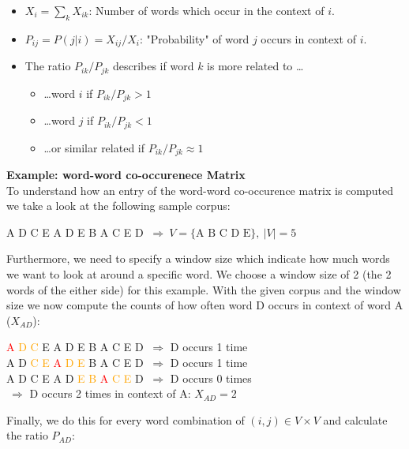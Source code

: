 \begin{itemize}
  \item $X_i = \sum_k X_{ik}$: Number of words which occur in the context of $i$.
  \item $P_{ij} = P(j | i) = X_{ij} / X_i$: "Probability" of word $j$ occurs in context of $i$.
  \item The ratio $P_{ik} / P_{jk}$ describes if word $k$ is more related to \dots
    \begin{itemize}
      \item \dots word $i$ if  $P_{ik} / P_{jk} > 1$
      \item \dots word $j$ if $P_{ik} / P_{jk} < 1$
      \item \dots or similar related if $P_{ik} / P_{jk} \approx 1$    
    \end{itemize}
\end{itemize}

\textbf{Example: word-word co-occurenece Matrix} \\

To understand how an entry of the word-word co-occurence matrix is computed we take a 
look at the following sample corpus:

\begin{center}
A D C E A D E B A C E D $\ \Rightarrow\ V = \{\text{A B C D E}\},\ |V| = 5$
\end{center}

Furthermore, we need to specify a window size which indicate how much words we want to look
at around a specific word. We choose a window size of 2 (the 2 words of the either side)  
for this example. With the given corpus and the window size we now compute the counts of
how often word D occurs in context of word A ($X_{AD}$):

\begin{center}
\textcolor{red}{A} \textcolor{orange}{D C} E A D E B A C E D $\ \Rightarrow$ D occurs 1 time \\
A D \textcolor{orange}{C E} \textcolor{red}{A} \textcolor{orange}{D E} B A C E D $\ \Rightarrow$ D occurs 1 time \\
A D C E A D \textcolor{orange}{E B} \textcolor{red}{A} \textcolor{orange}{C E} D $\ \Rightarrow$ D occurs 0 times \\
\phantom{A D C E A D E B A C E D} $\ \Rightarrow$ D occurs 2 times in context of A: $X_{AD} = 2$
\end{center}

Finally, we do this for every word combination of $(i, j) \in V \times V$ and calculate the 
ratio $P_{AD}$:

